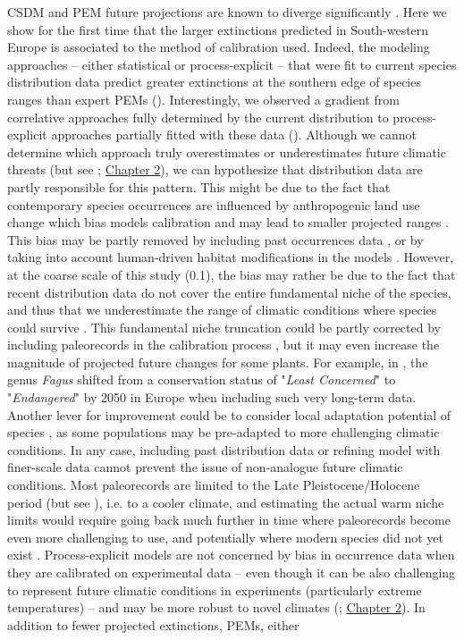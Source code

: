 \documentclass[letterpaper,8pt]{article}  %
\begin{document}
\begin{doublespacing}
\begin{linenumbers}
CSDM and PEM future projections are known to diverge significantly \citep{Morin2009, Keenan2011a, Cheaib2012, Takolander2019}.
Here we show for the first time that the larger extinctions predicted in South-western Europe is associated to the method of calibration used. Indeed, the modeling approaches -- either statistical or process-explicit -- that were fit to current species distribution data predict greater extinctions at the southern edge of species ranges than expert PEMs (). Interestingly, we observed a gradient from correlative approaches fully determined by the current distribution to process-explicit approaches partially fitted with these data (). Although we cannot determine which approach truly overestimates or underestimates future climatic threats (but see \citealp{VanderMeersch2024}; \hyperref[chapter2]{Chapter 2}), we can hypothesize that distribution data are partly responsible for this pattern. This might be due to the fact that contemporary species occurrences are influenced by anthropogenic land use change which bias models calibration and may lead to smaller projected ranges \citep{Ay2017, Faurby2018}. This bias may be partly removed by including past occurrences data \citep{Faurby2018}, or by taking into account human-driven habitat modifications in the models \citep{Ay2017}. However, at the coarse scale of this study (0.1\degree), the bias may rather be due to the fact that recent distribution data do not cover the entire fundamental niche of the species, and thus that we underestimate the range of climatic conditions where species could survive \citep{NoguesBravo2016, Chevalier2024}. This fundamental niche truncation could be partly corrected by including paleorecords in the calibration process \citep{Maiorano2013}, but it may even increase the magnitude of projected future changes for some plants. For example, in \citet{NoguesBravo2016}, the genus \emph{Fagus} shifted from a conservation status of "\emph{Least Concerned}" to "\emph{Endangered}" by 2050 in Europe when including such very long-term data. Another lever for improvement could be to consider local adaptation potential of species \citep{BenitoGarzon2011}, as some populations may be pre-adapted to more challenging climatic conditions. In any case, including past distribution data or refining model with finer-scale data cannot prevent the issue of non-analogue future climatic conditions. Most paleorecords are limited to the Late Pleistocene/Holocene period (but see \citealp{Chiarenza2023}), i.e. to a cooler climate, and estimating the actual warm niche limits would require going back much further in time where paleorecords become even more challenging to use, and potentially where modern species did not yet exist \citep{Burke2018, Chevalier2024}. Process-explicit models are not concerned by bias in occurrence data when they are calibrated on experimental data -- even though it can be also challenging to represent future climatic conditions in experiments (particularly extreme temperatures) -- and may be more robust to novel climates (\citealp{VanderMeersch2024}; \hyperref[chapter2]{Chapter 2}). In addition to fewer projected extinctions, PEMs, either 
\end{linenumbers}
\end{doublespacing}
\end{document}
